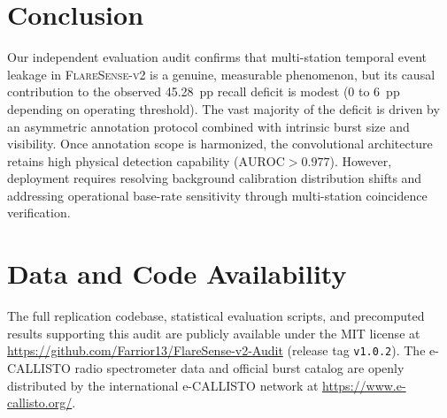 \documentclass[11pt,a4paper]{article}
\begin{document}
\section{Conclusion}

Our independent evaluation audit confirms that multi-station temporal event leakage in \textsc{FlareSense-v2} is a genuine, measurable phenomenon, but its causal contribution to the observed 45.28~pp recall deficit is modest (0 to 6~pp depending on operating threshold). The vast majority of the deficit is driven by an asymmetric annotation protocol combined with intrinsic burst size and visibility. Once annotation scope is harmonized, the convolutional architecture retains high physical detection capability ($\text{AUROC} > 0.977$). However, deployment requires resolving background calibration distribution shifts and addressing operational base-rate sensitivity through multi-station coincidence verification.

\section*{Data and Code Availability}
The full replication codebase, statistical evaluation scripts, and precomputed results supporting this audit are publicly available under the MIT license at \url{https://github.com/Farrior13/FlareSense-v2-Audit} (release tag \texttt{v1.0.2}). The e-CALLISTO radio spectrometer data and official burst catalog are openly distributed by the international e-CALLISTO network at \url{https://www.e-callisto.org/}.



\end{document}
